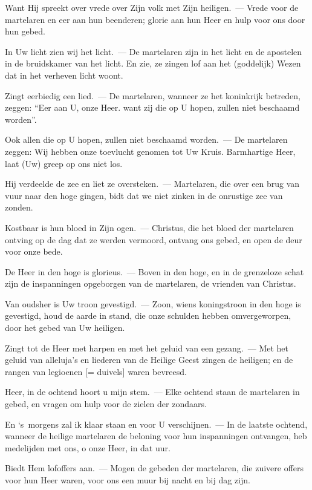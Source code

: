 \documentclass[12pt,twoside,a5paper]{article}
\begin{document}

\begin{halfparskip}
  Want Hij spreekt over vrede over Zijn volk met Zijn heiligen.~--- Vrede voor de martelaren en eer aan hun beenderen; glorie aan hun Heer en hulp voor ons door hun gebed.

  In Uw licht zien wij het licht.~--- De martelaren zijn in het licht en de apostelen in de bruidskamer van het licht. En zie, ze zingen lof aan het (goddelijk) Wezen dat in het verheven licht woont.

  Zingt eerbiedig een lied.~--- De martelaren, wanneer ze het koninkrijk betreden, zeggen: ``Eer aan U, onze Heer. want zij die op U hopen, zullen niet beschaamd worden''.

  Ook allen die op U hopen, zullen niet beschaamd worden.~--- De martelaren zeggen: Wij hebben onze toevlucht genomen tot Uw Kruis. Barmhartige Heer, laat (Uw) greep op ons niet los.

  Hij verdeelde de zee en liet ze oversteken.~--- Martelaren, die over een brug van vuur naar den hoge gingen, bidt dat we niet zinken in de onrustige zee van zonden.

  Kostbaar is hun bloed in Zijn ogen.~--- Christus, die het bloed der martelaren ontving op de dag dat ze werden vermoord, ontvang ons gebed, en open de deur voor onze bede.

  De Heer in den hoge is glorieus.~--- Boven in den hoge, en in de grenzeloze schat zijn de inspanningen opgeborgen van de martelaren, de vrienden van Christus.

  Van oudsher is Uw troon gevestigd.~--- Zoon, wiens koningstroon in den hoge is gevestigd, houd de aarde in stand, die onze schulden hebben omvergeworpen, door het gebed van Uw heiligen.

  Zingt tot de Heer met harpen en met het geluid van een gezang.~--- Met het geluid van alleluja's en liederen van de Heilige Geest zingen de heiligen; en de rangen van legioenen [= duivels] waren bevreesd.

  Heer, in de ochtend hoort u mijn stem.~--- Elke ochtend staan de martelaren in gebed, en vragen om hulp voor de zielen der zondaars.

  En `s~morgens zal ik klaar staan en voor U verschijnen.~--- In de laatste ochtend, wanneer de heilige martelaren de beloning voor hun inspanningen ontvangen, heb medelijden met ons, o onze Heer, in dat uur.

  Biedt Hem lofoffers aan.~--- Mogen de gebeden der martelaren, die zuivere offers voor hun Heer waren, voor ons een muur bij nacht en bij dag zijn.


\end{halfparskip}
\end{document}
